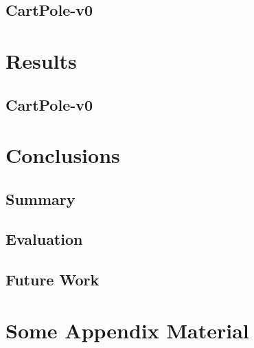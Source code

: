 \documentclass[11pt, a4paper, bibliography=totoc]{report}
\begin{document}
\section{CartPole-v0}

\chapter{Results}
\section{CartPole-v0}

\chapter{Conclusions}
\section{Summary}
\section{Evaluation}
\section{Future Work}





\appendix
\appendixpage
\noappendicestocpagenum
\addappheadtotoc
\chapter{Some Appendix Material}
\end{document}
